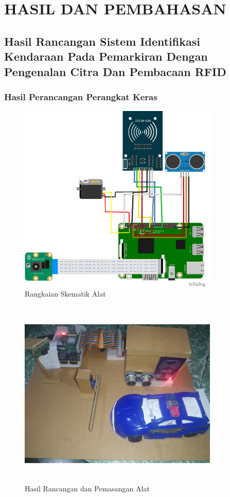 \chapter{HASIL DAN PEMBAHASAN}

\section{Hasil Rancangan Sistem Identifikasi Kendaraan Pada Pemarkiran Dengan Pengenalan Citra Dan Pembacaan RFID}

\subsection{Hasil Perancangan Perangkat Keras}
\begin{figure} [H]
    \includegraphics[width=0.85\textwidth, center]{images/skematik-full.png}
    \caption{Rangkaian Skematik Alat}
    \label{fig:rangkaianSkematikAlat}
\end{figure}

\begin{figure} [H]
    \includegraphics[height=9cm, width=0.85\textwidth, center]{images/alat-full-mobil.jpg}
    \caption{Hasil Rancangan dan Pemasangan Alat}
    \label{fig:alatfullmobil}
\end{figure}

